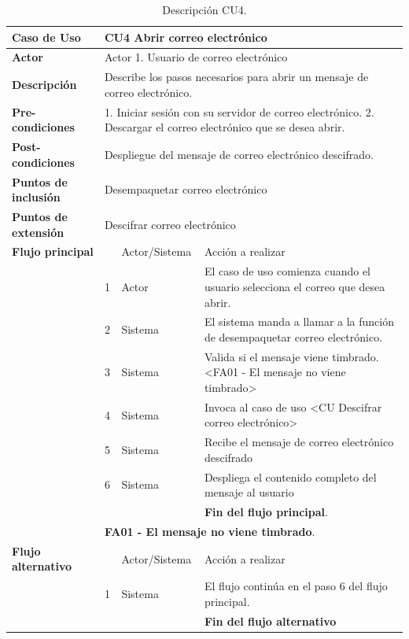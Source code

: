 \documentclass[12pt,oneside,onecolumn,openany]{report}
\begin{document}
\begin{table}[H]
\centering
   {
     \begin{tabular}{| p{} | p{} |p{4cm}|p{5cm}|}
     \hline
     \textbf{Caso de Uso} &\multicolumn{3}{|l|}{CU4 Abrir correo electrónico}\\
     \hline
     \textbf{Actor} & \multicolumn{3}{|l|}{Actor 1. Usuario de correo electrónico}\\
     \hline
     \textbf{Descripción} & \multicolumn{3}{|p{10cm}|}{Describe los pasos necesarios para abrir un mensaje de correo electrónico.}\\
     \hline
     \textbf{Pre-condiciones} & \multicolumn{3}{|p{10cm}|}{1. Iniciar sesión con su servidor de correo electrónico. 2. Descargar el correo electrónico que se desea abrir.}\\
     \hline
     \textbf{Post-condiciones} & \multicolumn{3}{|l|}{Despliegue del mensaje de correo electrónico descifrado.}\\
     \hline
     \textbf{Puntos de inclusión} & \multicolumn{3}{|l|}{Desempaquetar correo electrónico}\\
     \hline
     \textbf{Puntos de extensión} & \multicolumn{3}{|l|}{Descifrar correo electrónico}\\
     \hline
     \textbf{Flujo principal} & & Actor/Sistema & Acción a realizar\\
     \hline
     & 1 & Actor & El caso de uso comienza cuando el usuario selecciona el correo que desea abrir.\\
     \hline
     & 2 & Sistema & El sistema manda a llamar a la función de desempaquetar correo electrónico.\\
     \hline
     & 3 & Sistema & Valida si el mensaje viene timbrado. <FA01 - El mensaje no viene timbrado>\\
     \hline
     & 4 & Sistema & Invoca al caso de uso <CU Descifrar correo electrónico>\\
     \hline
     & 5 & Sistema & Recibe el mensaje de correo electrónico descifrado\\
     \hline
     & 6 & Sistema & Despliega el contenido completo del mensaje al usuario\\
     \hline
     & & & \textbf{Fin del flujo principal}.\\
     \hline
     & \multicolumn{3}{|l|}{\textbf{FA01 - El mensaje no viene timbrado}.}\\
     \hline
     \textbf{Flujo alternativo} & & Actor/Sistema & Acción a realizar\\
     \hline
     & 1 & Sistema & El flujo continúa en el paso 6 del flujo principal.\\
     \hline
     &  & & \textbf{Fin del flujo alternativo}\\
     
     \end{tabular}
    }
    \caption{Descripción CU4.}
    \label{tabla:CU4}
\end{table}
\end{document}
